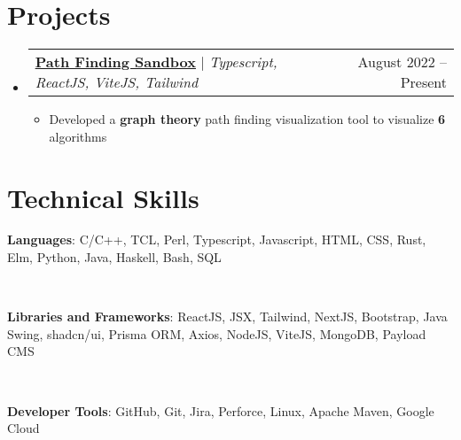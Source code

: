 \documentclass[letterpaper,11pt]{article}
\makeatletter
\newcommand{\resumeItem}[1]{
  \item\small{
    {#1 \vspace{-2pt}}
  }
}
\newcommand{\resumeProjectHeading}[2]{
    \vspace{-2pt}\item
    \begin{tabular*}{0.97\textwidth}{l@{\extracolsep{\fill}}r}
        #1 & #2 \\
    \end{tabular*}\vspace{-7pt}
}
\newcommand{\resumeListItem}[1]{
    \vspace{-2pt}\item#1
}
\newcommand{\resumeSubHeadingListStart}{\begin{itemize}[leftmargin=0.15in, label={}]}
\newcommand{\resumeSubHeadingListEnd}{\end{itemize}}
\newcommand{\resumeListStart}{\begin{itemize}[itemindent=-0.33in,leftmargin=0.48in, label={}]}
\newcommand{\resumeListEnd}{\end{itemize}}
\newcommand{\resumeItemListStart}{\begin{itemize}}
\newcommand{\resumeItemListEnd}{\end{itemize}\vspace{-5pt}}
\makeatother
\begin{document}
\section{Projects}
    \resumeSubHeadingListStart
       \resumeProjectHeading
            {\href{https://github.com/fvcci/Path-Finding-Sandbox}{\textbf{\underline{Path Finding Sandbox}}} $|$ \emph{Typescript, ReactJS, ViteJS, Tailwind}}{August 2022 -- Present}
            \resumeItemListStart
                \resumeItem{Developed a \textbf{graph theory} path finding visualization tool to visualize \textbf{6} algorithms}
            \resumeItemListEnd


    \resumeSubHeadingListEnd


%
\section{Technical Skills}
    \resumeListStart\small{
        \resumeListItem{\textbf{Languages}:
            C/C++, TCL, Perl, Typescript, Javascript, HTML, CSS, Rust, Elm, Python, Java, Haskell, Bash, SQL
        } \\
        \resumeListItem{\textbf{Libraries and Frameworks}:
            ReactJS, JSX, Tailwind, NextJS, Bootstrap, Java Swing, shadcn/ui, Prisma ORM, Axios, NodeJS, ViteJS, MongoDB, Payload CMS
        } \\
        \resumeListItem{\textbf{Developer Tools}:
            GitHub, Git, Jira, Perforce, Linux, Apache Maven, Google Cloud
        } \\
    } \resumeListEnd
\end{document}
